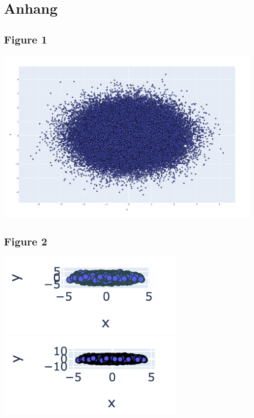 \documentclass{article}
\begin{document}
\newpage
\printbibliography

\newpage

\section{Anhang}
\centering
\subsection{Figure 1}
\includegraphics[width=1\textwidth]{img/random_dots.png}

\subsection{Figure 2}
\includegraphics[width=0.7\textwidth]{img/svg_quality.png}
\includegraphics[width=0.7\textwidth]{img/webgl_quality.png}
\end{document}
